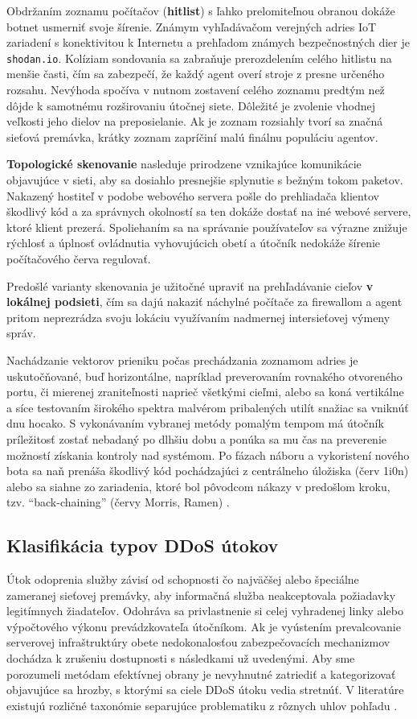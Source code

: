 \documentclass[12pt, a4paper]{article}
\begin{document}
Obdržaním zoznamu počítačov (\textbf{hitlist}) s ľahko prelomiteľnou obranou dokáže botnet usmerniť svoje 
šírenie. Známym vyhľadávačom verejných adries IoT zariadení s konektivitou k Internetu a prehľadom
známych bezpečnostných dier je \verb|shodan.io|. Kolíziam sondovania sa zabraňuje prerozdelením celého 
hitlistu na menšie časti, čím sa zabezpečí, že každý agent overí stroje z presne určeného rozsahu. Nevýhoda 
spočíva v nutnom zostavení celého zoznamu predtým než dôjde k samotnému rozširovaniu útočnej siete. Dôležité 
je zvolenie vhodnej veľkosti jeho dielov na preposielanie. Ak je zoznam rozsiahly tvorí sa značná sieťová 
premávka, krátky zoznam zapríčiní malú finálnu populáciu agentov. 

\textbf{Topologické skenovanie} nasleduje prirodzene vznikajúce komunikácie objavujúce v sieti, aby
sa dosiahlo presnejšie splynutie s bežným tokom paketov. Nakazený hostiteľ v podobe webového servera 
pošle do prehliadača klientov škodlivý kód a za správnych okolností sa ten dokáže dostať na iné webové
servere, ktoré klient prezerá. Spoliehaním sa na správanie používateľov sa výrazne znižuje rýchlosť a 
úplnosť ovládnutia vyhovujúcich obetí a útočník nedokáže šírenie počítačového červa regulovať.

Predošlé varianty skenovania je užitočné upraviť na prehľadávanie cieľov \textbf{v lokálnej podsieti}, 
čím sa dajú nakaziť náchylné počítače za firewallom a agent pritom neprezrádza svoju lokáciu využívaním
nadmernej intersieťovej výmeny správ.   

Nachádzanie vektorov prieniku počas prechádzania zoznamom adries je uskutočňované, buď horizontálne,
napríklad preverovaním rovnakého otvoreného portu, či mierenej zraniteľnosti naprieč všetkými cieľmi, alebo
sa koná vertikálne a síce testovaním širokého spektra malvérom pribalených utilít snažiac sa vniknúť
dnu hocako. S vykonávaním vybranej metódy pomalým tempom má útočník príležitosť zostať nebadaný po dlhšiu
dobu a ponúka sa mu čas na preverenie možností získania kontroly nad systémom. Po fázach náboru a 
vykoristení nového bota sa naň prenáša škodlivý kód pochádzajúci z centrálneho úložiska (červ 1i0n) alebo
sa siahne zo zariadenia, ktoré bol pôvodcom nákazy v predošlom kroku, tzv. \enquote{back-chaining} (červy
Morris, Ramen) \cite{ddos-anatomy-2004}. 

\subsection{Klasifikácia typov DDoS útokov}
Útok odoprenia služby závisí od schopnosti čo najväčšej alebo špeciálne zameranej sieťovej 
premávky, aby informačná služba neakceptovala požiadavky legitímnych žiadateľov. Odohráva sa
privlastnenie si celej vyhradenej linky alebo výpočtového výkonu prevádzkovateľa útočníkom. 
Ak je vyústením prevalcovanie serverovej infraštruktúry obete nedokonalosťou zabezpečovacích 
mechanizmov dochádza k zrušeniu dostupnosti s následkami už uvedenými. Aby sme porozumeli metódam 
efektívnej obrany je nevyhnutné zatriediť a kategorizovať objavujúce sa
hrozby, s ktorými sa ciele DDoS útoku vedia stretnúť. V literatúre existujú rozličné taxonómie 
separujúce problematiku z rôznych uhlov pohľadu \cite{ddos-attacks} \cite{botnets} \cite{ddos-anatomy-2004} 
\cite{csirt-ddos}.
\end{document}
